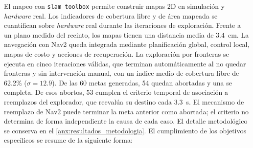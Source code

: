 El mapeo con \texttt{slam\_toolbox} permite construir mapas 2D en simulación y \textit{hardware} real. Los indicadores de cobertura libre y de área mapeada se cuantifican sobre \textit{hardware} real durante las iteraciones de exploración. Frente a un plano medido del recinto, los mapas tienen una distancia media de 3.4~cm.
La navegación con Nav2 queda integrada mediante planificación global,
control local, mapas de costo y acciones de recuperación. La exploración por fronteras se ejecuta en cinco iteraciones válidas, que
terminan automáticamente al no quedar fronteras y sin intervención manual, con
un índice medio de cobertura libre de 62.2\% ($\sigma=12.9$). De las 60 metas
generadas, 54 quedan abortadas y una se completa. De esos abortos, 53 cumplen
el criterio temporal de asociación a reemplazos del explorador, que reevalúa
su destino cada 3.3~s. El mecanismo de reemplazo de Nav2 puede terminar la
meta anterior como abortada; el criterio no determina de forma independiente
la causa de cada caso. El detalle metodológico se conserva en el
\ref{anx:resultados_metodologia}.
El cumplimiento de los objetivos específicos se resume de la siguiente forma:


